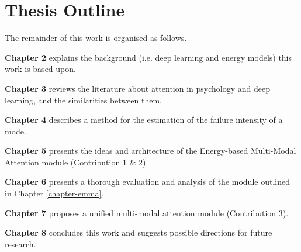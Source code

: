\section{Thesis Outline}
The remainder of this work is organised as follows.
\begin{description}
\item \textbf{Chapter 2} explains the background (i.e. deep learning and energy models) this work is based upon.
\item \textbf{Chapter 3} reviews the literature about attention in psychology and deep learning, and the similarities between them.
\item \textbf{Chapter 4} describes a method for the estimation of the failure intensity of a mode.
\item \textbf{Chapter 5} presents the ideas and architecture of the Energy-based Multi-Modal Attention module (Contribution 1 \& 2).
\item \textbf{Chapter 6} presents a thorough evaluation and analysis of the module outlined in Chapter \ref{chapter-emma}.
\item \textbf{Chapter 7} proposes a unified multi-modal attention module (Contribution 3).
\item \textbf{Chapter 8} concludes this work and suggests possible directions for future research.
\end{description}